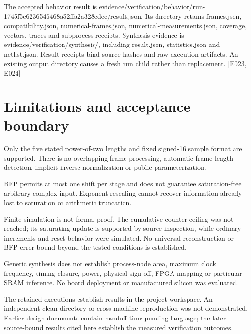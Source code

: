 \documentclass[11pt,a4paper]{article}
\begin{document}
The accepted behavior result is evidence/\allowbreak{}verification/\allowbreak{}behavior/\allowbreak{}run-1745f5c6236546468a52ffa2a328cdec/\allowbreak{}result.json. Its directory retains frames.json,\allowbreak{} compatibility.json,\allowbreak{} numerical-frames.json,\allowbreak{} numerical-measurements.json,\allowbreak{} coverage,\allowbreak{} vectors,\allowbreak{} traces and subprocess receipts. Synthesis evidence is evidence/\allowbreak{}verification/\allowbreak{}synthesis/\allowbreak{},\allowbreak{} including result.json,\allowbreak{} statistics.json and netlist.json. Result receipts bind source hashes and raw execution artifacts. An existing output directory causes a fresh run child rather than replacement. [\allowbreak{}E023,\allowbreak{} E024]\allowbreak{}


\section{Limitations and acceptance boundary}

Only the five stated power-of-two lengths and fixed signed-16 sample format are supported. There is no overlapping-frame processing,\allowbreak{} automatic frame-length detection,\allowbreak{} implicit inverse normalization or public parameterization.


BFP permits at most one shift per stage and does not guarantee saturation-free arbitrary complex input. Exponent rescaling cannot recover information already lost to saturation or arithmetic truncation.


Finite simulation is not formal proof. The cumulative counter ceiling was not reached; its saturating update is supported by source inspection,\allowbreak{} while ordinary increments and reset behavior were simulated. No universal reconstruction or BFP-error bound beyond the tested conditions is established.


Generic synthesis does not establish process-node area,\allowbreak{} maximum clock frequency,\allowbreak{} timing closure,\allowbreak{} power,\allowbreak{} physical sign-off,\allowbreak{} FPGA mapping or particular SRAM inference. No board deployment or manufactured silicon was evaluated.


The retained executions establish results in the project workspace. An independent clean-directory or cross-machine reproduction was not demonstrated. Earlier design documents contain handoff-time pending language; the later source-bound results cited here establish the measured verification outcomes.
\end{document}

